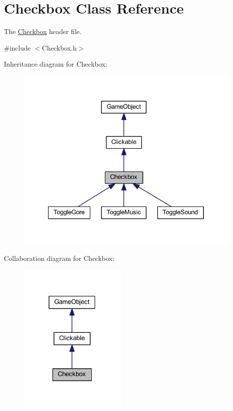 \hypertarget{class_checkbox}{\section{Checkbox Class Reference}
\label{class_checkbox}
}


The \hyperlink{class_checkbox}{Checkbox} header file.  




{\ttfamily \#include $<$Checkbox.\+h$>$}



Inheritance diagram for Checkbox\+:
\nopagebreak
\begin{figure}[H]
\begin{center}
\leavevmode
\includegraphics[width=327pt]{class_checkbox__inherit__graph}
\end{center}
\end{figure}


Collaboration diagram for Checkbox\+:\nopagebreak
\begin{figure}[H]
\begin{center}
\leavevmode
\includegraphics[width=151pt]{class_checkbox__coll__graph}
\end{center}
\end{figure}
